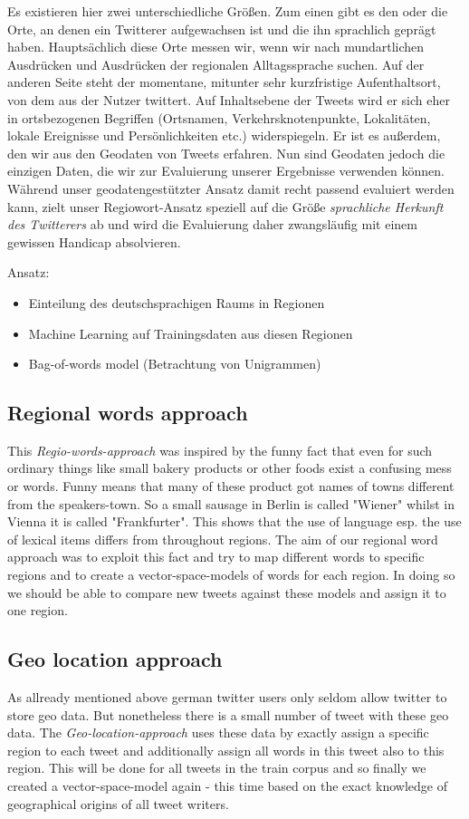 \documentclass[../Main.tex]{subfiles}
\begin{document}
Es existieren hier zwei unterschiedliche Größen. Zum einen gibt es den oder die Orte, an denen ein Twitterer aufgewachsen ist und die ihn sprachlich geprägt haben. Hauptsächlich diese Orte messen wir, wenn wir nach mundartlichen Ausdrücken und Ausdrücken der regionalen Alltagssprache suchen. Auf der anderen Seite steht der momentane, mitunter sehr kurzfristige Aufenthaltsort, von dem aus der Nutzer twittert. Auf Inhaltsebene der Tweets wird er sich eher in ortsbezogenen Begriffen (Ortsnamen, Verkehrsknotenpunkte, Lokalitäten, lokale Ereignisse und Persönlichkeiten etc.) widerspiegeln. Er ist es außerdem, den wir aus den Geodaten von Tweets erfahren. Nun sind Geodaten jedoch die einzigen Daten, die wir zur Evaluierung unserer Ergebnisse verwenden können. Während unser geodatengestützter Ansatz damit recht passend evaluiert werden kann, zielt unser Regiowort-Ansatz speziell auf die Größe \textit{sprachliche Herkunft des Twitterers} ab und wird die Evaluierung daher zwangsläufig mit einem gewissen Handicap absolvieren.

Ansatz:
\begin{itemize}
\item Einteilung des deutschsprachigen Raums in Regionen
\item Machine Learning auf Trainingsdaten aus diesen Regionen
\item Bag-of-words model (Betrachtung von Unigrammen)
\end{itemize}

\subsection{Regional words approach}
This \emph{Regio-words-approach} was inspired by the funny fact that even for such ordinary things like small bakery products or other foods exist a confusing mess or words. Funny means that many of these product got names of towns different from the speakers-town. So a small sausage in Berlin is called "Wiener" whilst in Vienna it is called "Frankfurter". This shows that the use of language esp. the use of lexical items differs from throughout regions. The aim of our regional word approach was to exploit this fact and try to map different words to specific regions and to create a vector-space-models of words for each region. In doing so we should be able to compare new tweets against these models and assign it to one region.

\subsection{Geo location approach}
As allready mentioned above german twitter users only seldom allow twitter to store geo data. But nonetheless there is a small number of tweet with these geo data. The \emph{Geo-location-approach} uses these data by exactly assign a specific region to each tweet and additionally assign all words in this tweet also to this region. This will be done for all tweets in the train corpus and so finally we created a vector-space-model again - this time based on the exact knowledge of geographical origins of all tweet writers. 
\end{document}
